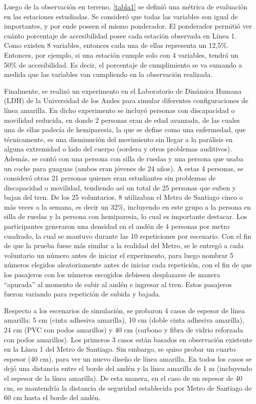 Luego de la observación en terreno, \ref{tabla1} se definió una métrica de evaluación en las estaciones estudiadas. Se consideró que todas las variables son igual de importantes, y por ende poseen el mismo ponderador. El ponderador permitió ver cuánto porcentaje de accesibilidad posee cada estación observada en Línea 1. Como existen 8 variables, entonces cada una de ellas representa un 12,5\%. Entonces, por ejemplo, si una estación cumple solo con 4 variables, tendrá un 50\% de accesibilidad. Es decir, el porcentaje de cumplimiento se va sumando a medida que las variables van cumpliendo en la observación realizada.

Finalmente, se realizó un experimento en el Laboratorio de Dinámica Humana (LDH) de la Universidad de los Andes para simular diferentes configuraciones de línea amarilla. En dicho experimento se incluyó personas con discapacidad o movilidad reducida, en donde 2 personas eran de edad avanzada, de las cuales una de ellas padecía de hemiparesia, la que se define como una enfermedad, que técnicamente, es una disminución del movimiento sin llegar a la parálisis en alguna extremidad o lado del cuerpo (sordera y otros problemas auditivos). Además, se contó con una persona con silla de ruedas y una persona que usaba un coche para guaguas (ambos eran jóvenes de 24 años). A estas 4 personas, se consideró otras 21 personas quienes eran estudiantes sin problemas de discapacidad o movilidad, tendiendo así un total de 25 personas que suben y bajan del tren. De los 25 voluntarios, 8 utilizaban el Metro de Santiago cinco o más veces a la semana, es decir un 32\%, incluyendo en este grupo a la persona en silla de ruedas y la persona con hemiparesia, lo cual es importante destacar. Los participantes generaron una densidad en el andén de 4 personas por metro cuadrado, la cual se mantuvo durante las 10 repeticiones por escenario. Con el fin de que la prueba fuese más similar a la realidad del Metro, se le entregó a cada voluntario un número antes de iniciar el experimento, para luego nombrar 5 números elegidos aleatoriamente antes de iniciar cada repetición, con el fin de que los pasajeros con los números escogidos debiesen desplazarse de manera “apurada” al momento de subir al andén e ingresar al tren. Estos pasajeros fueron variando para repetición de subida y bajada.

Respecto a los escenarios de simulación, se probaron 4 casos de espesor de línea amarilla: 5 cm (cinta adhesiva amarilla), 10 cm (doble cinta adhesiva amarilla), 24 cm (PVC con podos amarillos) y 40 cm (carbono y fibra de vidrio reforzada con podos amarillos). Los primeros 3 casos están basados en observación existente en la Línea 1 del Metro de Santiago. Sin embargo, se quiso probar un cuarto espesor (40 cm), para ver un nuevo diseño de línea amarilla. En todos los casos se dejó una distancia entre el borde del andén y la línea amarilla de 1 m (incluyendo el espesor de la línea amarilla). De esta manera, en el caso de un espesor de 40 cm, se mantendría la distancia de seguridad establecida por Metro de Santiago de 60 cm hasta el borde del andén. 

